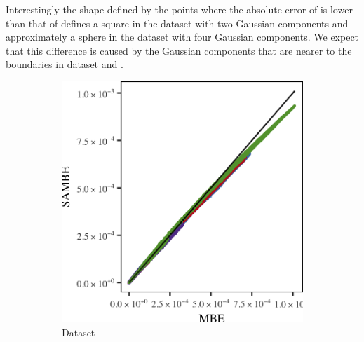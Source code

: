 	Interestingly the shape defined by the points where the absolute error of \mbe is lower than that of \sambe defines a square in the dataset with two Gaussian components and approximately a sphere in the dataset with four Gaussian components. We expect that this difference is caused by the Gaussian components that are nearer to the boundaries in dataset \ferdosiThree and \baakmanThree. 

	\begin{figure}
		\centering
		\begin{subfigure}{0.23\textwidth}
			\centering
			\includegraphics[keepaspectratio=true, width=\textwidth, height=0.23\textheight]{discussion/img/ferdosi_3_120000_mbe_sambe.png}
			\caption{Dataset \ferdosiThree}
			\label{fig:discussion:multisphere:mbevssambe:ferdosi3}
		\end{subfigure}
		\begin{subfigure}{0.23\textwidth}
			\centering

\end{subfigure}
\end{figure}
